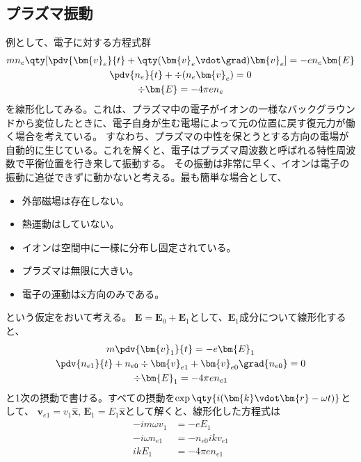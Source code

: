 \subsection{プラズマ振動}
例として、電子に対する方程式群
\begin{gather}
	mn_e\qty[\pdv{\bm{v}_e}{t} + \qty(\bm{v}_e\vdot\grad)\bm{v}_e]  = -en_e\bm{E} \\
	\pdv{n_e}{t} + \div(n_e\bm{v}_e)                                = 0           \\
	\div{\bm{E}}                                                    = -4\pi{}en_e
\end{gather}
を線形化してみる。これは、プラズマ中の電子がイオンの一様なバックグラウンドから変位したときに、電子自身が生む電場によって元の位置に戻す復元力が働く場合を考えている。
すなわち、プラズマの中性を保とうとする方向の電場が自動的に生じている。これを解くと、電子は{\color{red}プラズマ周波数}と呼ばれる特性周波数で平衡位置を行き来して振動する。
その振動は非常に早く、イオンは電子の振動に追従できずに動かないと考える。最も簡単な場合として、
\begin{itemize}
	\item 外部磁場は存在しない。
	\item 熱運動はしていない。
	\item イオンは空間中に一様に分布し固定されている。
	\item プラズマは無限に大きい。
	\item 電子の運動は$\hat{\bm{x}}$方向のみである。
\end{itemize}
という仮定をおいて考える。
$\bm{E} = \bm{E}_0 + \bm{E}_1$として、$\bm{E}_1$成分について線形化すると、
\begin{gather}
	m\pdv{\bm{v}_1}{t}                                                    = -e\bm{E}_1 \\
	\pdv{n_{e1}}{t} + n_{e0}\div{\bm{v}_{e1}} + \bm{v}_{e0}\grad{n_{e0}}  = 0          \\
	\div{\bm{E}_1} = -4\pi e n_{e1}
\end{gather}
と1次の摂動で書ける。すべての摂動を$\exp\qty{i(\bm{k}\vdot\bm{r} - \omega{}t)}$として、
$\bm{v}_{e1} = v_1\hat{\bm{x}},\,\bm{E}_1 = E_1\hat{\bm{x}}$として解くと、線形化した方程式は
\begin{align}
	-im\omega{}v_1   & = -eE_1           \label{eq:1} \\
	-i\omega{}n_{e1} & = -n_{e0}ikv_{e1} \label{eq:2} \\
	ikE_1            & = -4\pi{}en_{e1} \label{eq:3}
\end{align}
